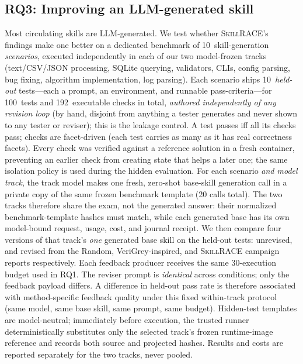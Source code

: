 \documentclass[acmsmall,screen,review,anonymous]{acmart}
\newcommand{\tool}{\textsc{SkillRACE}\xspace}
\newcommand{\NumScenarios}{10}
\newcommand{\NumTestsPer}{10}
\newcommand{\NumTestsTot}{100}
\newcommand{\NumChecksTot}{192}
\newcommand{\Budget}{30}                     %
\begin{document}
\subsection{RQ3: Improving an LLM-generated skill}
\label{sec:rq3}

Most circulating skills are LLM-generated. We test whether \tool's findings make one
better on a dedicated benchmark of \NumScenarios\ skill-generation \emph{scenarios},
executed independently in each of our two model-frozen tracks
(text/CSV/JSON processing, SQLite querying, validators, CLIs, config parsing, bug fixing,
algorithm implementation, log parsing). Each scenario ships \NumTestsPer\ \emph{held-out}
tests---each a prompt, an environment, and runnable pass-criteria---for \NumTestsTot\ tests
and \NumChecksTot\ executable checks in total, \emph{authored independently of any revision
loop} (by hand, disjoint from anything a tester generates and never shown to any tester or
reviser); this is the leakage control. A test passes iff all its checks pass; checks are
facet-driven (each test carries as many as it has real correctness facets). Every check was
verified against a reference solution in a fresh container, preventing an earlier check
from creating state that helps a later one; the same isolation policy is used during the
hidden evaluation. For each scenario \emph{and model track}, the track model makes one
fresh, zero-shot base-skill generation call in a private copy of the same frozen
benchmark template (20 calls total). The two tracks therefore share the exam, not the
generated answer: their normalized benchmark-template hashes must match, while each
generated base has its own model-bound request, usage, cost, and journal receipt. We then
compare four versions of that track's \emph{one} generated base skill on the held-out
tests: unrevised, and revised from the Random, VeriGrey-inspired, and \tool campaign
reports respectively. Each feedback
producer receives the same \Budget-execution budget used in RQ1. The reviser prompt is
\emph{identical} across conditions; only the feedback payload differs. A difference in
held-out pass rate is therefore associated with method-specific feedback quality under this
fixed within-track protocol (same model, same base skill, same prompt, same budget).
Hidden-test templates are model-neutral; immediately before execution, the trusted
runner deterministically substitutes only the selected track's frozen runtime-image
reference and records both source and projected hashes. Results and costs are reported
separately for the two tracks, never pooled.
\end{document}
